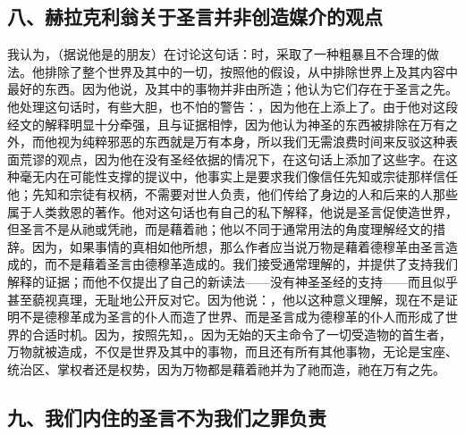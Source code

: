 
\subsection{八、赫拉克利翁关于圣言并非创造媒介的观点}

我认为，（据说他是的朋友）在讨论这句话：时，采取了一种粗暴且不合理的做法。他排除了整个世界及其中的一切，按照他的假设，从中排除世界上及其内容中最好的东西。因为他说，及其中的事物并非由所造；他认为它们存在于圣言之先。他处理这句话时，有些大胆，也不怕的警告：，因为他在上添上了。由于他对这段经文的解释明显十分牵强，且与证据相悖，因为他认为神圣的东西被排除在万有之外，而他视为纯粹邪恶的东西就是万有本身，所以我们无需浪费时间来反驳这种表面荒谬的观点，因为他在没有圣经依据的情况下，在这句话上添加了这些字。在这种毫无内在可能性支撑的提议中，他事实上是要求我们像信任先知或宗徒那样信任他；先知和宗徒有权柄，不需要对世人负责，他们传给了身边的人和后来的人那些属于人类救恩的著作。他对这句话也有自己的私下解释，他说是圣言促使造世界，但圣言不是从祂或凭祂，而是藉着祂；他以不同于通常用法的角度理解经文的措辞。因为，如果事情的真相如他所想，那么作者应当说万物是藉着德穆革由圣言造成的，而不是藉着圣言由德穆革造成的。我们接受通常理解的，并提供了支持我们解释的证据；而他不仅提出了自己的新读法——没有神圣圣经的支持——而且似乎甚至藐视真理，无耻地公开反对它。因为他说：，他以这种意义理解，现在不是证明不是德穆革成为圣言的仆人而造了世界、而是圣言成为德穆革的仆人而形成了世界的合适时机。因为，按照先知，。因为无始的天主命令了一切受造物的首生者，万物就被造成，不仅是世界及其中的事物，而且还有所有其他事物，无论是宝座、统治区、掌权者还是权势，因为万物都是藉着祂并为了祂而造，祂在万有之先。\par


\subsection{九、我们内住的圣言不为我们之罪负责}

